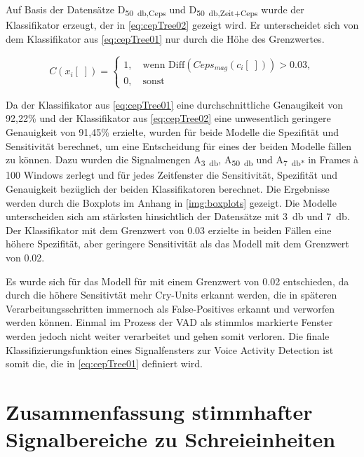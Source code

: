 Auf Basis der Datensätze D\textsubscript{\SI{50}{\decibel},Ceps} und D\textsubscript{\SI{50}{\decibel},Zeit+Ceps} wurde der Klassifikator erzeugt, der in \autoref{eq:cepTree02} gezeigt wird. Er unterscheidet sich von dem Klassifikator aus \autoref{eq:cepTree01} nur durch die Höhe des Grenzwertes.

\begin{equation}
C(x_i[\;]) = \begin{cases}
1, \quad \text{wenn  Diff}(Ceps_{mag}(c_i[\;])) > 0.03, \\
0, \quad \text{sonst}
\end{cases}
\label{eq:cepTree02}
\end{equation}

Da der Klassifikator aus \autoref{eq:cepTree01} eine durchschnittliche Genaugikeit von 92,22\% und der Klassifikator aus \autoref{eq:cepTree02} eine unwesentlich geringere Genauigkeit von 91,45\% erzielte, wurden für beide Modelle die Spezifität und Sensitivität berechnet, um eine Entscheidung für eines der beiden Modelle fällen zu können. Dazu wurden die Signalmengen A\textsubscript{\SI{3}{\decibel}}, A\textsubscript{\SI{50}{\decibel}} und A\textsubscript{\SI{7}{\decibel}*} in Frames \`{a} 100 Windows zerlegt und für jedes Zeitfenster die Sensitivität, Spezifität und Genauigkeit bezüglich der beiden Klassifikatoren berechnet. Die Ergebnisse werden durch die Boxplots im Anhang in \autoref{img:boxplots} gezeigt. Die Modelle unterscheiden sich am stärksten hinsichtlich der Datensätze mit \SI{3}{\decibel} und \SI{7}{\decibel}. Der Klassifikator mit dem Grenzwert von 0.03 erzielte in beiden Fällen eine höhere Spezifität, aber geringere Sensitivität als das Modell mit dem Grenzwert von 0.02. 

Es wurde sich für das Modell für mit einem Grenzwert von 0.02 entschieden, da durch die höhere Sensitivtät mehr Cry-Units erkannt werden, die in späteren Verarbeitungsschritten immernoch als False-Positives erkannt und verworfen werden können. Einmal im Prozess der VAD als stimmlos markierte Fenster werden jedoch nicht weiter verarbeitet und gehen somit \glqq verloren\grqq. Die finale Klassifizierungsfunktion eines Signalfensters zur Voice Activity Detection ist somit die, die in \autoref{eq:cepTree01} definiert wird.

\section{Zusammenfassung stimmhafter Signalbereiche zu Schreieinheiten}
\label{sec:marking_cry-units_new}

